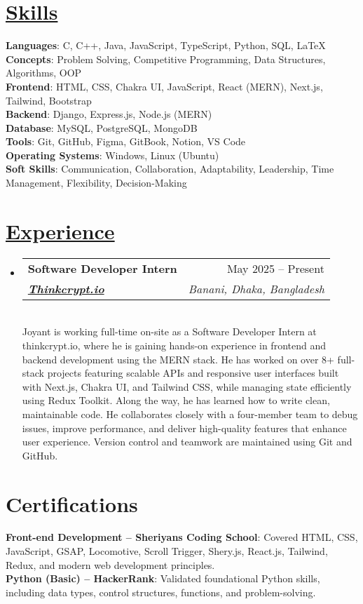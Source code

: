 \documentclass[a4paper, 11pt]{article}
\newcommand{\resumeSection}[2]{
  \section{\textbf{\href{#1}{#2}}}
}
\newcommand{\resumeSubheading}[5]{
  \vspace{-2pt}\item
    \begin{tabularx}{\textwidth}[t]{X r}
      \textbf{#1} & #2 \\
      \textbf{\textit{\href{#3}{\small #4}}} & \textit{\small #5} \\
    \end{tabularx}\vspace{-7pt}
}
\newcommand{\resumeSubHeadingListStart}{\begin{itemize}[leftmargin=0in, label={}]}
\newcommand{\resumeItemListEnd}{\end{itemize}\vspace{-5pt}}
\begin{document}
\resumeSection{https://joyant.me/skills}{Skills}
 \begin{itemize}[leftmargin=0in, label={}]
    \small{\item{
        \textbf{Languages}{: C, C++, Java, JavaScript, TypeScript, Python, SQL, LaTeX} \\
        \textbf{Concepts}{: Problem Solving, Competitive Programming, Data Structures, Algorithms, OOP} \\
        \textbf{Frontend}{: HTML, CSS, Chakra UI, JavaScript, React (MERN), Next.js, Tailwind, Bootstrap} \\
        \textbf{Backend}{: Django, Express.js, Node.js (MERN)} \\
        \textbf{Database}{: MySQL, PostgreSQL, MongoDB} \\
        \textbf{Tools}{: Git, GitHub, Figma, GitBook, Notion, VS Code} \\
        \textbf{Operating Systems}{: Windows, Linux (Ubuntu)} \\
        \textbf{Soft Skills}{: Communication, Collaboration, Adaptability, Leadership, Time Management, Flexibility, Decision-Making}
    }}
 \end{itemize}

\resumeSection{https://joyant.me/experience}{Experience}
    \resumeSubHeadingListStart
        \resumeSubheading
            {Software Developer Intern}{May 2025 -- Present}
            {https://www.thinkcrypt.dev/}{Thinkcrypt.io}{Banani, Dhaka, Bangladesh } \\ \vspace{10pt}
            Joyant is working full-time on-site as a Software Developer Intern at thinkcrypt.io, where he is gaining hands-on experience in frontend and backend development using the MERN stack. He has worked on over 8+ full-stack projects featuring scalable APIs and responsive user interfaces built with Next.js, Chakra UI, and Tailwind CSS, while managing state efficiently using Redux Toolkit. Along the way, he has learned how to write clean, maintainable code. He collaborates closely with a four-member team to debug issues, improve performance, and deliver high-quality features that enhance user experience. Version control and teamwork are maintained using Git and GitHub.
    \resumeItemListEnd

\section{\textbf{Certifications}}
  \begin{itemize}[leftmargin=0in, label={}]
    \small{\item{
      \textbf{Front-end Development – Sheriyans Coding School}{: Covered HTML, CSS, JavaScript, GSAP, Locomotive, Scroll Trigger, Shery.js, React.js, Tailwind, Redux, and modern web development principles.} \\
      \textbf{Python (Basic) – HackerRank}{: Validated foundational Python skills, including data types, control structures, functions, and problem-solving.}
    }}
  \end{itemize}
\end{document}
